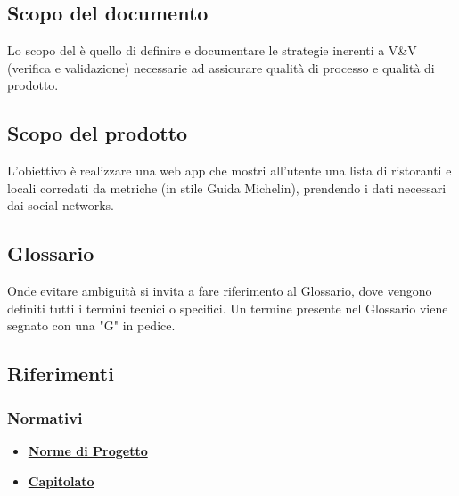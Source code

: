 \subsection{Scopo del documento}
Lo scopo del \PdQ{} è quello di definire e documentare le strategie inerenti a V\&V (verifica
e validazione) necessarie ad assicurare qualità di processo e qualità di prodotto.

\subsection{Scopo del prodotto}
L'obiettivo è realizzare una web app che mostri all'utente una lista di ristoranti e locali 
corredati da metriche (in stile Guida Michelin), prendendo i dati necessari dai social networks.

\subsection{Glossario}
Onde evitare ambiguità si invita a fare riferimento al Glossario, dove vengono definiti tutti 
i termini tecnici o specifici. Un termine presente nel Glossario viene segnato con una "G" in pedice.

\subsection{Riferimenti}
\subsubsection{Normativi}
\begin{itemize}
    \item \href{https://github.com/Bug-s-Bunny-Team/docs/tree/master/src/Interni/Norme_Di_Progetto}{\textbf{Norme di Progetto}}
    \item \href{https://www.math.unipd.it/~tullio/IS-1/2021/Progetto/C4p.pdf}{\textbf{Capitolato}}
\end{itemize}

